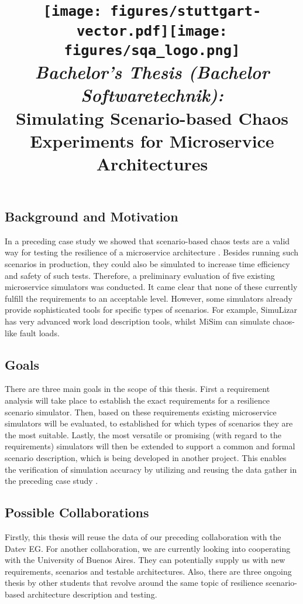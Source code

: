 \documentclass[a4paper,12pt]{article}
\date{}
\title{
\texttt{[image: figures/stuttgart-vector.pdf]}\hfill{\texttt{[image: figures/sqa\_logo.png]}}
\quad \\ [0.5cm]
{\large \textit{Bachelor's Thesis (Bachelor Softwaretechnik):}} \\ [1mm]
{\Large Simulating Scenario-based Chaos Experiments for Microservice Architectures}
}
\begin{document}
	

\maketitle

\thispagestyle{empty}

\vspace{-2.5cm}


\subsection*{Background and Motivation}
In a preceding case study we showed that scenario-based chaos tests are a valid way for testing the resilience of a microservice architecture \cite{CaseStudyDatev}. Besides running such scenarios in production, they could also be simulated to increase time efficiency and safety of such tests. 
Therefore, a preliminary evaluation of five existing microservice simulators was conducted. It came clear that none of these currently fulfill the requirements to an acceptable level. 
However, some simulators already provide sophisticated tools for specific types of scenarios. For example, SimuLizar \cite{SimuLizar1} has very advanced work load description tools, whilst MiSim \cite{MiSim} can simulate chaos-like fault loads. 

\subsection*{Goals}
There are three main goals in the scope of this thesis. First a requirement analysis will take place to establish the exact requirements for a resilience scenario simulator.
Then, based on these requirements existing microservice simulators will be evaluated, to established for which types of scenarios they are the most suitable.
Lastly, the most versatile or promising (with regard to the requirements) simulators will then be extended to support a common and formal scenario description, which is being developed in another project. 
This enables the verification of simulation accuracy by utilizing and reusing the data gather in the preceding case study \cite{CaseStudyDatev}.

\subsection*{Possible Collaborations}
Firstly, this thesis will reuse the data of our preceding collaboration with the Datev EG. For another collaboration, we are currently looking into cooperating with the University of Buenos Aires. They can potentially supply us with new requirements, scenarios and testable architectures. Also, there are three ongoing thesis by other students that revolve around the same topic of resilience scenario-based architecture description and testing.
\end{document}
